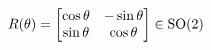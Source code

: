 \documentclass[preview]{standalone}
\begin{document}
\begin{align*}
\special{dvisvgm:raw <g id='unique000'>}R(\theta) = \begin{bmatrix} \cos\theta & -\sin\theta \\ \sin\theta & \cos\theta \end{bmatrix} \in \text{SO}(2)\special{dvisvgm:raw </g>}
\end{align*}
\end{document}
